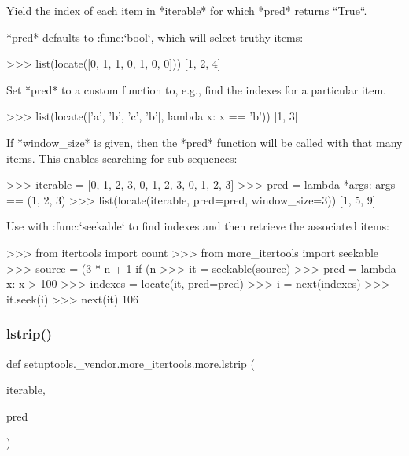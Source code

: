 \begin{DoxyVerb}Yield the index of each item in *iterable* for which *pred* returns
``True``.

*pred* defaults to :func:`bool`, which will select truthy items:

    >>> list(locate([0, 1, 1, 0, 1, 0, 0]))
    [1, 2, 4]

Set *pred* to a custom function to, e.g., find the indexes for a particular
item.

    >>> list(locate(['a', 'b', 'c', 'b'], lambda x: x == 'b'))
    [1, 3]

If *window_size* is given, then the *pred* function will be called with
that many items. This enables searching for sub-sequences:

    >>> iterable = [0, 1, 2, 3, 0, 1, 2, 3, 0, 1, 2, 3]
    >>> pred = lambda *args: args == (1, 2, 3)
    >>> list(locate(iterable, pred=pred, window_size=3))
    [1, 5, 9]

Use with :func:`seekable` to find indexes and then retrieve the associated
items:

    >>> from itertools import count
    >>> from more_itertools import seekable
    >>> source = (3 * n + 1 if (n %
    >>> it = seekable(source)
    >>> pred = lambda x: x > 100
    >>> indexes = locate(it, pred=pred)
    >>> i = next(indexes)
    >>> it.seek(i)
    >>> next(it)
    106\end{DoxyVerb}
 \mbox{\label{namespacesetuptools_1_1__vendor_1_1more__itertools_1_1more_a20f3fff7a2235b5cbabd885f755aac46}} 
\subsubsection{\texorpdfstring{lstrip()}{lstrip()}}
{\footnotesize\ttfamily def setuptools.\+\_\+vendor.\+more\+\_\+itertools.\+more.\+lstrip (\begin{DoxyParamCaption}\item[{}]{iterable,  }\item[{}]{pred }\end{DoxyParamCaption})}

